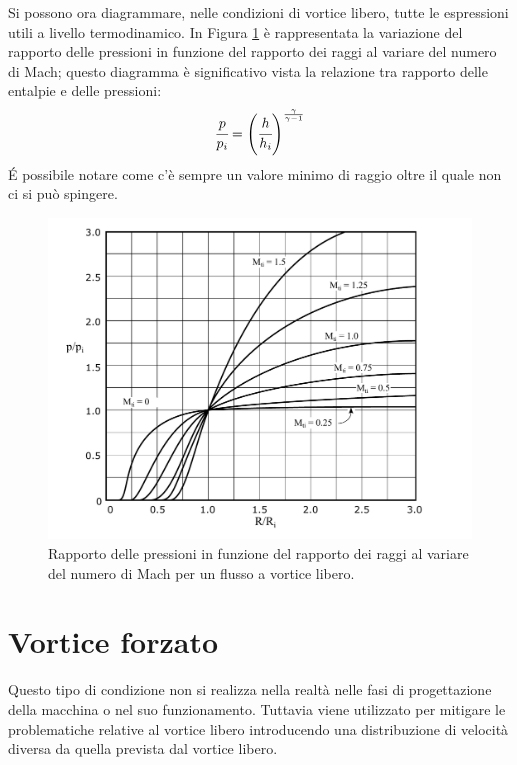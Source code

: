 Si possono ora diagrammare, nelle condizioni di vortice libero, tutte le espressioni utili a livello termodinamico. In Figura \ref{fig:VorticeLibero} è rappresentata la variazione del rapporto delle pressioni in funzione del rapporto dei raggi al variare del numero di Mach; questo diagramma è significativo vista la relazione tra rapporto delle entalpie e delle pressioni:
\begin{align*}
	\cfrac{p}{p_i} = \left( \cfrac{h}{h_i} \right)^{\frac{\gamma}{\gamma - 1}}
\end{align*}
\'E possibile notare come c'è sempre un valore minimo di raggio oltre il quale non ci si può spingere.
\begin{figure}
\centering
  \includegraphics[width=.75\textwidth]{fig/VorticeLibero.pdf}
\caption{Rapporto delle pressioni in funzione del rapporto dei raggi al variare del numero di Mach per un flusso a vortice libero.}
\label{fig:VorticeLibero}
\end{figure}
\section{Vortice forzato}
Questo tipo di condizione non si realizza nella realtà nelle fasi di progettazione della macchina o nel suo funzionamento. Tuttavia viene utilizzato per mitigare le problematiche relative al vortice libero introducendo una distribuzione di velocità diversa da quella prevista dal vortice libero.

